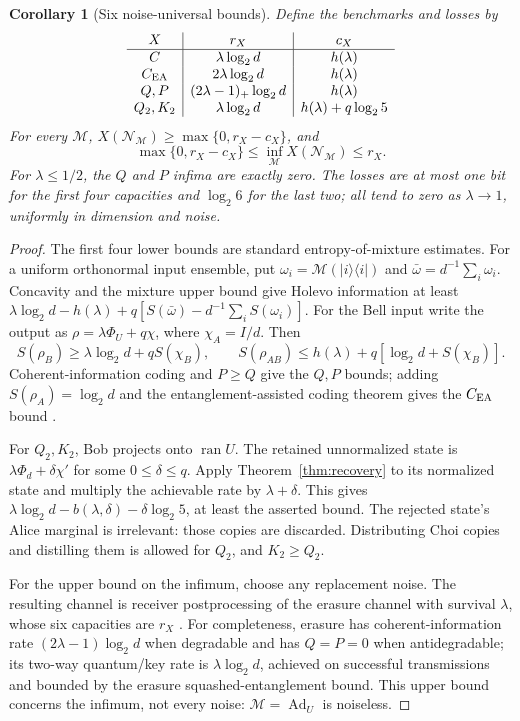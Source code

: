 \documentclass[11pt]{article}
\newtheorem{corollary}[theorem]{Corollary}
\begin{document}
\begin{corollary}[Six noise-universal bounds]\label{cor:universal}
Define the benchmarks and losses by
\[
\begin{array}{c|c|c}
 X&r_X&c_X\\ \hline
 C&\lambda\log_2d&h(\lambda)\\
 C_{\rm EA}&2\lambda\log_2d&h(\lambda)\\
 Q,P&(2\lambda-1)_+\log_2d&h(\lambda)\\
 Q_2,K_2&\lambda\log_2d&h(\lambda)+q\log_2 5
\end{array}
\]
For every $\mathcal M$, $X(\mathcal N_{\mathcal M})\ge
\max\{0,r_X-c_X\}$, and
\begin{equation}\label{eq:minimaxbounds}
 \max\{0,r_X-c_X\}\le\inf_{\mathcal M}X(\mathcal N_{\mathcal M})\le r_X.
\end{equation}
For $\lambda\le1/2$, the $Q$ and $P$ infima are exactly zero.
The losses are at most one bit for the first four capacities and
$\log_2 6$ for the last two; all tend to zero as $\lambda\to1$,
uniformly in dimension and noise.
\end{corollary}
\begin{proof}
The first four lower bounds are standard entropy-of-mixture estimates.
For a uniform orthonormal input ensemble, put
$\omega_i=\mathcal M(|i\rangle\langle i|)$ and
$\bar\omega=d^{-1}\sum_i\omega_i$. Concavity and the mixture upper bound
give Holevo information at least
$\lambda\log_2d-h(\lambda)+q[S(\bar\omega)-d^{-1}\sum_iS(\omega_i)]$.
For the Bell input write the output as
$\rho=\lambda\Phi_U+q\chi$, where $\chi_A=I/d$. Then
\[
 S(\rho_B)\ge\lambda\log_2d+qS(\chi_B),\qquad
 S(\rho_{AB})\le h(\lambda)+q[\log_2d+S(\chi_B)].
\]
Coherent-information coding and $P\ge Q$ give the $Q,P$ bounds;
adding $S(\rho_A)=\log_2d$ and the entanglement-assisted coding theorem
gives the $C_{\rm EA}$ bound \cite{wq,bsst}.

For $Q_2,K_2$, Bob projects onto $\operatorname{ran}U$. The retained
unnormalized state is $\lambda\Phi_d+\delta\chi'$ for some
$0\le\delta\le q$. Apply Theorem~\ref{thm:recovery} to its normalized
state and multiply the achievable rate by $\lambda+\delta$.
This gives $\lambda\log_2d-b(\lambda,\delta)-\delta\log_2 5$,
at least the asserted bound. The rejected state's Alice marginal is
irrelevant: those copies are discarded. Distributing Choi copies and
distilling them is allowed for $Q_2$, and $K_2\ge Q_2$.

For the upper bound on the infimum, choose any replacement noise.
The resulting channel is receiver postprocessing of the erasure channel
with survival $\lambda$, whose six capacities are $r_X$
\cite{bds,bsst,dsw}. For completeness, erasure has coherent-information
rate $(2\lambda-1)\log_2d$ when degradable and has $Q=P=0$ when
antidegradable; its two-way quantum/key rate is $\lambda\log_2d$,
achieved on successful transmissions and bounded by the erasure
squashed-entanglement bound. This upper bound concerns the infimum,
not every noise: $\mathcal M=\operatorname{Ad}_U$ is noiseless.
\end{proof}
\end{document}

